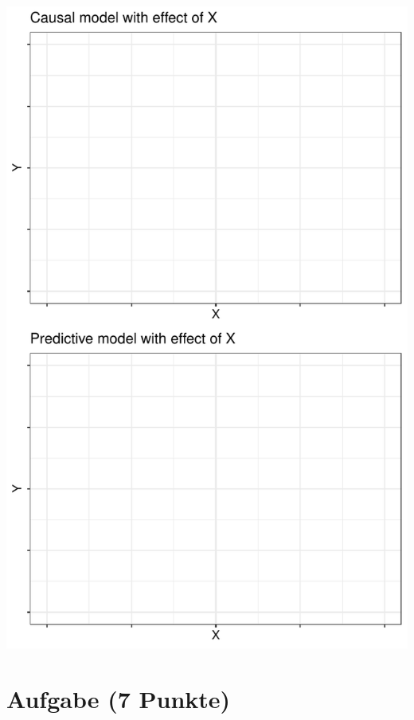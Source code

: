 \documentclass[a4paper, 10pt]{scrartcl}\usepackage[]{graphicx}\usepackage[]{xcolor}
\makeatletter
\def\maxwidth{ %
  \ifdim\Gin@nat@width>\linewidth
    \linewidth
  \else
    \Gin@nat@width
  \fi
}
\makeatother
\begin{document}
{\centering \includegraphics[width=\maxwidth]{img/modeling-01-1} 

}



 
\clearpage

\section{Aufgabe \hfill (7 Punkte)}
\end{document}

